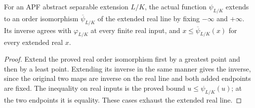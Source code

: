 \begin{lemma}
\label{fw:apf-herbrand-extended}
\leanok
For an APF abstract separable extension $L/K$, the actual function
$\psi_{L/K}$ extends to an order isomorphism $\overline\psi_{L/K}$ of
the extended real line by fixing $-\infty$ and $+\infty$.
Its inverse agrees with $\varphi_{L/K}$ at every finite real input,
and $x\leq\overline\psi_{L/K}(x)$ for every extended real $x$.
\end{lemma}
\begin{proof}
Extend the proved real order isomorphism first by a greatest point and
then by a least point. Extending its inverse in the same manner gives
the inverse, since the original two maps are inverse on the real
line and both added endpoints are fixed. The inequality on real inputs
is the proved bound $u\leq\psi_{L/K}(u)$; at the two endpoints it is
equality. These cases exhaust the extended real line.
\end{proof}

